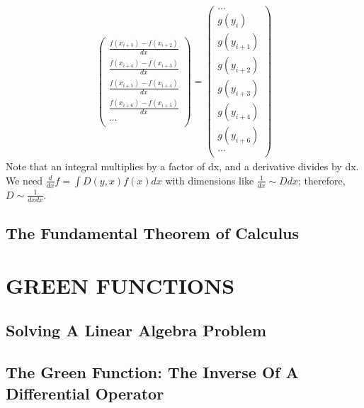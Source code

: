 \documentclass[12pt]{article}
\begin{document}
\begin{equation}
\begin{split}
\begin{pmatrix}
\frac{f(x_{i+3}) - f(x_{i+2})}{dx} \\
\frac{f(x_{i+4}) - f(x_{i+3})}{dx} \\
\frac{f(x_{i+5}) - f(x_{i+4})}{dx} \\
\frac{f(x_{i+6}) - f(x_{i+5})}{dx} \\
... \\
\end{pmatrix}
=
\begin{pmatrix}
... \\
g(y_i) \\
g(y_{i+1}) \\
g(y_{i+2}) \\
g(y_{i+3}) \\
g(y_{i+4}) \\
g(y_{i+6}) \\
... \\
\end{pmatrix}
\end{split}
\end{equation}
Note that an integral multiplies by a factor of dx, and a derivative divides by dx. We need $\frac{d}{dx}f = \int D(y,x)f(x)dx$ with dimensions like $\frac{1}{dx} \sim D dx$; therefore, $D \sim \frac{1}{dxdx}$. 

\subsection{The Fundamental Theorem of Calculus}

\section{GREEN FUNCTIONS}
\subsection{Solving A Linear Algebra Problem}
\subsection{The Green Function: The Inverse Of A Differential Operator}

\end{document}
